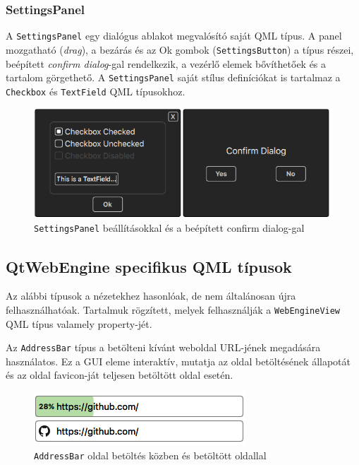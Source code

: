 \documentclass[12pt]{report}
\begin{document}
\subsubsection{SettingsPanel}
A \texttt{SettingsPanel} egy dialógus ablakot megvalósító saját QML típus. A panel
mozgatható (\textit{drag}), a bezárás és az Ok gombok (\texttt{SettingsButton}) a típus
részei, beépített \textit{confirm dialog}-gal rendelkezik, a vezérlő elemek bővíthetőek
és a tartalom görgethető. A \texttt{SettingsPanel} saját stílus definíciókat is tartalmaz
a \texttt{Checkbox} és \texttt{TextField} QML típusokhoz.

\begin{figure}[H]
    \centering
    \includegraphics[scale=0.7]{SettingsPanel}
    \caption{
        \label{fig:settings-panel}
        \texttt{SettingsPanel} beállításokkal és a beépített confirm dialog-gal
    }
\end{figure}

\subsection{QtWebEngine specifikus QML típusok}
Az alábbi típusok a nézetekhez hasonlóak, de nem általánosan újra felhasználhatóak.
Tartalmuk rögzített, melyek felhasználják a \texttt{WebEngineView} QML típus valamely
property-jét.

Az \texttt{AddressBar} típus a betölteni kívánt weboldal URL-jének megadására használatos.
Ez a GUI eleme interaktív, mutatja az oldal betöltésének állapotát és az oldal favicon-ját
teljesen betöltött oldal esetén.
\begin{figure}[H]
    \centering
    \includegraphics[scale=0.8]{AddressBar}
    \caption{
        \label{fig:address-bar}
        \texttt{AddressBar} oldal betöltés közben és betöltött oldallal
    }
\end{figure}
\end{document}
